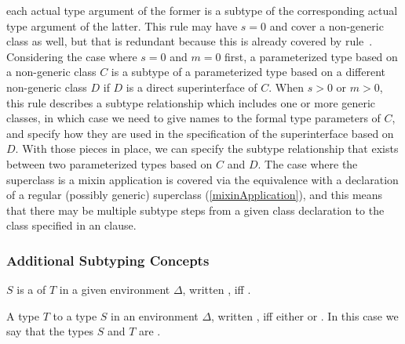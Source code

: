 \documentclass[makeidx]{article}
\begin{document}
{{\begin{itemize}
  each actual type argument of the former is a subtype of
  the corresponding actual type argument of the latter.
  This rule may have $s = 0$ and cover a non-generic class as well,
  but that is redundant because this is already covered by
  rule~\SrnReflexivity.
  Considering the case where $s = 0$ and $m = 0$ first,
  a parameterized type based on a non-generic class $C$ is a subtype of
  a parameterized type based on a different non-generic class $D$ if
  $D$ is a direct superinterface of $C$.
  When $s > 0$ or $m > 0$, this rule describes a subtype relationship
  which includes one or more generic classes,
  in which case we need to give names to the formal type parameters of $C$,
  and specify how they are used in the specification of the superinterface
  based on $D$.
  With those pieces in place, we can specify the subtype relationship
  that exists between two parameterized types based on $C$ and $D$.
  The case where the superclass is a mixin application is covered via
  the equivalence with a declaration of a regular (possibly generic) superclass
  (\ref{mixinApplication}),
  and this means that there may be multiple subtype steps from
  a given class declaration to the class specified in an \EXTENDS{} clause.
\end{itemize}%
}


\subsubsection{Additional Subtyping Concepts}

\LMHash{}%
$S$ is a  of $T$ in a given environment $\Delta$,
written ,
if{}f .

\LMHash{}%
A type $T$
to a type $S$ in an environment $\Delta$,
written ,
if{}f either  or .
In this case we say that the types $S$ and $T$ are
.



}
\end{document}
